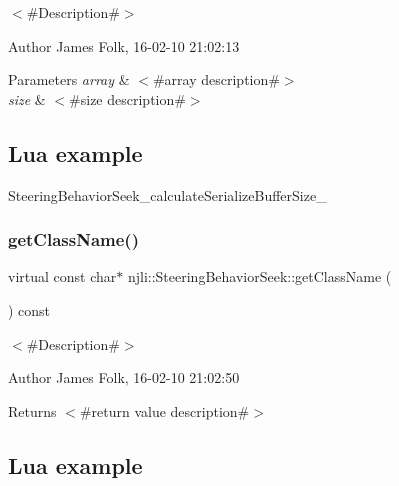 $<$\#\+Description\#$>$ 

\begin{DoxyAuthor}{Author}
James Folk, 16-\/02-\/10 21\+:02\+:13
\end{DoxyAuthor}

\begin{DoxyParams}{Parameters}
{\em array} & $<$\#array description\#$>$ \\
\hline
{\em size} & $<$\#size description\#$>$\\
\hline
\end{DoxyParams}
\hypertarget{classnjli_1_1_steering_behavior_wander_ex1}{}\subsection{Lua example}\label{classnjli_1_1_steering_behavior_wander_ex1}

\begin{DoxyCodeInclude}
\end{DoxyCodeInclude}
Steering\+Behavior\+Seek\+\_\+calculate\+Serialize\+Buffer\+Size\+\_\+ \mbox{\label{classnjli_1_1_steering_behavior_seek_a9bb4813f6247ada457c2fcf36ceeeece}} 
\subsubsection{\texorpdfstring{get\+Class\+Name()}{getClassName()}}
{\footnotesize\ttfamily virtual const char$\ast$ njli\+::\+Steering\+Behavior\+Seek\+::get\+Class\+Name (\begin{DoxyParamCaption}{ }\end{DoxyParamCaption}) const\hspace{0.3cm}{\ttfamily [virtual]}}



$<$\#\+Description\#$>$ 

\begin{DoxyAuthor}{Author}
James Folk, 16-\/02-\/10 21\+:02\+:50
\end{DoxyAuthor}
\begin{DoxyReturn}{Returns}
$<$\#return value description\#$>$
\end{DoxyReturn}
\hypertarget{classnjli_1_1_steering_behavior_wander_ex1}{}\subsection{Lua example}\label{classnjli_1_1_steering_behavior_wander_ex1}

